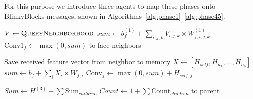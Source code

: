 \documentclass[12pt,a4paper]{report}
\begin{document}
For this purpose we introduce three agents to map these phases onto BlinkyBlocks messages, shown in Algorithms~\ref{alg:phase1}--\ref{alg:phase45}.

\begin{algorithm}[H]
\caption{Phase 1: Local Feature Extraction (Conv1)}
\label{alg:phase1}
\begin{algorithmic}[1]
    \State $V \gets \Call{QueryNeighborhood}{}$ 
        \State $sum \gets b^{(1)}_f + \sum_{i,j,k} V_{i,j,k} \times W^{(1)}_{f,i,j,k}$
        \State $\text{Conv1}_f \gets \max(0, sum)$
    \EndFor
        \State {}
    \EndIf
    \State {} to face-neighbors
\EndFunction
\end{algorithmic}
\end{algorithm}

\begin{algorithm}[H]
\caption{Phases 2/3: Message-Passed Convolution (Conv2, Conv3)}
\label{alg:phase23}
\begin{algorithmic}[1]
    \State Save received feature vector from neighbor to memory
        \State $X \gets [H_{self}, H_{n_1}, \dots, H_{n_6}]$ 
            \State $sum \gets b_f + \sum_i X_i \times W_{f,i}$
            \State $\text{Conv}_f \gets \max(0, sum) + H_{self,f}$ 
        \EndFor
        \State {}
    \EndIf
\EndFunction
\end{algorithmic}
\end{algorithm}

\begin{algorithm}[H]
\caption{Phases 4/5: Distributed Aggregation and Classification}
\label{alg:phase45}
\begin{algorithmic}[1]
        \State $Sum \gets H^{(3)} + \sum \text{Sum}_{children}$
        \State $Count \gets 1 + \sum \text{Count}_{children}$
            \State {} 
        \Else
            \State {} to parent
        \EndIf
    \EndIf
\EndFunction
\end{algorithmic}
\end{algorithm}
\end{document}
